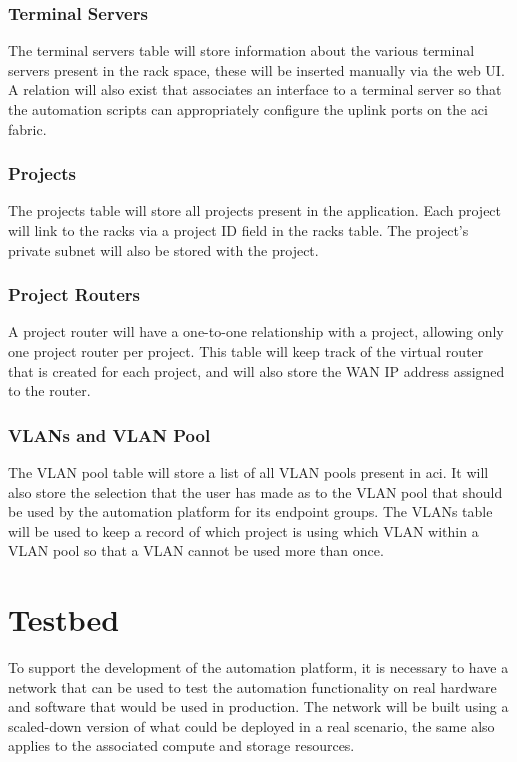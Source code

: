 \subsubsection{Terminal Servers}
\label{design:web-application:database:terminal-servers}
The terminal servers
table will store information about the various terminal servers present in the
rack space, these will be inserted manually via the web UI. A relation will
also exist that associates an interface to a terminal server so that the
automation scripts can appropriately configure the uplink ports on the
\gls{aci} fabric.

\subsubsection{Projects}
\label{design:web-application:database:projects}
The projects table will store
all projects present in the application. Each project will link to the racks
via a project ID field in the racks table. The project's private subnet will
also be stored with the project.

\subsubsection{Project Routers}
\label{design:web-application:database:project-routers}
A project router will
have a one-to-one relationship with a project, allowing only one project router
per project. This table will keep track of the virtual router that is created
for each project, and will also store the WAN IP address assigned to the
router.

\subsubsection{VLANs and VLAN Pool}
\label{design:web-application:database:vlan-and-vlan-pool}
The VLAN pool table
will store a list of all VLAN pools present in \gls{aci}. It will also store
the selection that the user has made as to the VLAN pool that should be used by
the automation platform for its endpoint groups. The VLANs table will be used
to keep a record of which project is using which VLAN within a VLAN pool so
that a VLAN cannot be used more than once.

\section{Testbed}
\label{design:Testbed}
To support the development of the automation platform,
it is necessary to have a network that can be used to test the automation
functionality on real hardware and software that would be used in production.
The network will be built using a scaled-down version of what could be deployed
in a real scenario, the same also applies to the associated compute and storage
resources.

